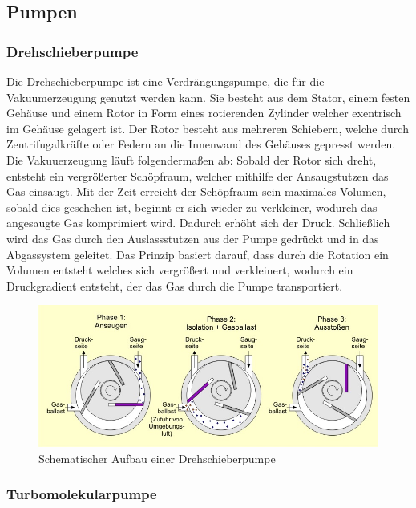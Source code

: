\subsection{Pumpen}
\subsubsection{Drehschieberpumpe}


Die Drehschieberpumpe ist eine Verdrängungspumpe, die für die Vakuumerzeugung genutzt werden kann.
Sie besteht aus dem Stator, einem festen Gehäuse und einem Rotor in Form eines rotierenden
Zylinder welcher exentrisch im Gehäuse gelagert ist. Der Rotor besteht aus mehreren Schiebern, welche durch Zentrifugalkräfte 
oder Federn an die Innenwand des Gehäuses gepresst werden. Die Vakuuerzeugung läuft folgendermaßen ab:
Sobald der Rotor sich dreht, entsteht ein vergrößerter Schöpfraum, welcher mithilfe der Ansaugstutzen das Gas
einsaugt. Mit der Zeit erreicht der Schöpfraum sein maximales Volumen, sobald dies geschehen ist, beginnt er sich wieder zu 
verkleiner, wodurch das angesaugte Gas komprimiert wird. Dadurch erhöht sich der Druck. Schließlich wird das Gas durch den Auslassstutzen 
aus der Pumpe gedrückt und in das Abgassystem geleitet. Das Prinzip basiert darauf, dass durch die Rotation ein Volumen entsteht welches sich vergrößert 
und verkleinert, wodurch ein Druckgradient entsteht, der das Gas durch die Pumpe transportiert.

\begin{figure}
    \includegraphics[width=\textwidth]{bilder/pumpe.jpeg}
    \caption{Schematischer Aufbau einer Drehschieberpumpe}
\end{figure}
\cite{drehschieberpumpe}

\subsubsection{Turbomolekularpumpe}

